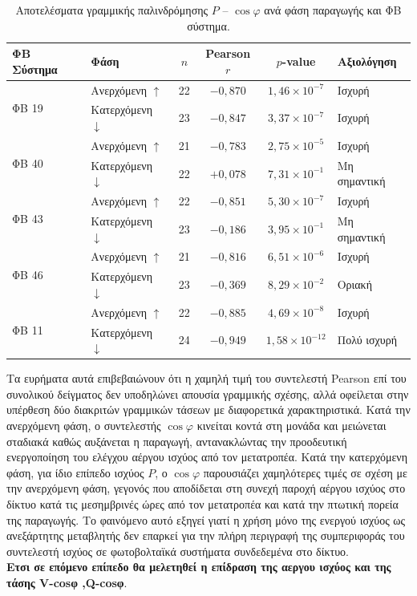 \begin{table}[htbp]
  \centering
  \caption{Αποτελέσματα γραμμικής παλινδρόμησης $P$ -- $\cos\varphi$ ανά φάση
           παραγωγής και ΦΒ σύστημα.}
  \label{tab:pearson_phase}
  \renewcommand{\arraystretch}{1.3}
  \begin{tabular}{llcccl}
    \hline
    \textbf{ΦΒ Σύστημα} & \textbf{Φάση} & \textbf{$n$} &
    \textbf{\textlatin{Pearson} $r$} & \textbf{$p$-\textlatin{value}} & \textbf{Αξιολόγηση} \\
    \hline
    \multirow{2}{*}{ΦΒ 19}
      & Ανερχόμενη $\uparrow$ & 22 & $-0{,}870$ & $1{,}46\times10^{-7}$ & Ισχυρή \\
      & Κατερχόμενη $\downarrow$ & 23 & $-0{,}847$ & $3{,}37\times10^{-7}$ & Ισχυρή \\
    \hline
    \multirow{2}{*}{ΦΒ 40}
      & Ανερχόμενη $\uparrow$ & 21 & $-0{,}783$ & $2{,}75\times10^{-5}$ & Ισχυρή \\
      & Κατερχόμενη $\downarrow$ & 22 & $+0{,}078$ & $7{,}31\times10^{-1}$ & Μη σημαντική \\
    \hline
    \multirow{2}{*}{ΦΒ 43}
      & Ανερχόμενη $\uparrow$ & 22 & $-0{,}851$ & $5{,}30\times10^{-7}$ & Ισχυρή \\
      & Κατερχόμενη $\downarrow$ & 23 & $-0{,}186$ & $3{,}95\times10^{-1}$ & Μη σημαντική \\
    \hline
    \multirow{2}{*}{ΦΒ 46}
      & Ανερχόμενη $\uparrow$ & 21 & $-0{,}816$ & $6{,}51\times10^{-6}$ & Ισχυρή \\
      & Κατερχόμενη $\downarrow$ & 23 & $-0{,}369$ & $8{,}29\times10^{-2}$ & Οριακή \\
    \hline
    \multirow{2}{*}{ΦΒ 11}
      & Ανερχόμενη $\uparrow$ & 22 & $-0{,}885$ & $4{,}69\times10^{-8}$ & Ισχυρή \\
      & Κατερχόμενη $\downarrow$ & 24 & $-0{,}949$ & $1{,}58\times10^{-12}$ & Πολύ ισχυρή \\
    \hline
  \end{tabular}
\end{table}

Τα ευρήματα αυτά επιβεβαιώνουν ότι η χαμηλή τιμή του συντελεστή \textlatin{Pearson} επί του
συνολικού δείγματος δεν υποδηλώνει απουσία γραμμικής σχέσης, αλλά οφείλεται στην
υπέρθεση δύο διακριτών γραμμικών τάσεων με διαφορετικά χαρακτηριστικά. Κατά την
ανερχόμενη φάση, ο συντελεστής $\cos\varphi$ κινείται κοντά στη μονάδα και μειώνεται
σταδιακά καθώς αυξάνεται η παραγωγή, αντανακλώντας την προοδευτική ενεργοποίηση
του ελέγχου αέργου ισχύος από τον μετατροπέα. Κατά την κατερχόμενη φάση, για ίδιο
επίπεδο ισχύος $P$, ο $\cos\varphi$ παρουσιάζει χαμηλότερες τιμές σε σχέση με
την ανερχόμενη φάση, γεγονός που αποδίδεται στη συνεχή παροχή αέργου ισχύος στο
δίκτυο κατά τις μεσημβρινές ώρες 
από τον μετατροπέα και κατά την πτωτική πορεία της παραγωγής. Το φαινόμενο αυτό εξηγεί γιατί η
χρήση μόνο της ενεργού ισχύος ως ανεξάρτητης μεταβλητής δεν επαρκεί για την πλήρη
περιγραφή της συμπεριφοράς του συντελεστή ισχύος σε φωτοβολταϊκά συστήματα
συνδεδεμένα στο δίκτυο.\\
\textbf{Ετσι σε επόμενο επίπεδο θα μελετηθεί  η επίδραση της αεργου ισχύος και της τάσης \textlatin{V-cos}φ ,\textlatin{Q-cos}φ}.

